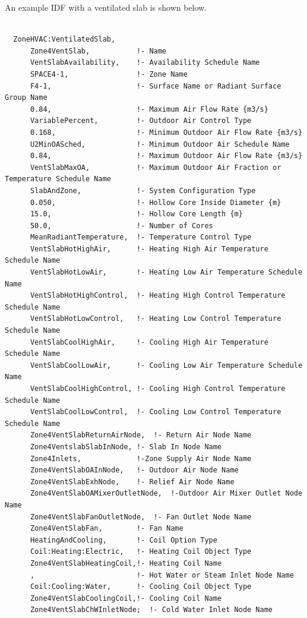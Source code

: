 An example IDF with a ventilated slab is shown below.

\begin{lstlisting}

  ZoneHVAC:VentilatedSlab,
      Zone4VentSlab,           !- Name
      VentSlabAvailability,    !- Availability Schedule Name
      SPACE4-1,                !- Zone Name
      F4-1,                    !- Surface Name or Radiant Surface Group Name
      0.84,                    !- Maximum Air Flow Rate {m3/s}
      VariablePercent,         !- Outdoor Air Control Type
      0.168,                   !- Minimum Outdoor Air Flow Rate {m3/s}
      U2MinOASched,            !- Minimum Outdoor Air Schedule Name
      0.84,                    !- Maximum Outdoor Air Flow Rate {m3/s}
      VentSlabMaxOA,           !- Maximum Outdoor Air Fraction or Temperature Schedule Name
      SlabAndZone,             !- System Configuration Type
      0.050,                   !- Hollow Core Inside Diameter {m}
      15.0,                    !- Hollow Core Length {m}
      50.0,                    !- Number of Cores
      MeanRadiantTemperature,  !- Temperature Control Type
      VentSlabHotHighAir,      !- Heating High Air Temperature Schedule Name
      VentSlabHotLowAir,       !- Heating Low Air Temperature Schedule Name
      VentSlabHotHighControl,  !- Heating High Control Temperature Schedule Name
      VentSlabHotLowControl,   !- Heating Low Control Temperature Schedule Name
      VentSlabCoolHighAir,     !- Cooling High Air Temperature Schedule Name
      VentSlabCoolLowAir,      !- Cooling Low Air Temperature Schedule Name
      VentSlabCoolHighControl, !- Cooling High Control Temperature Schedule Name
      VentSlabCoolLowControl,  !- Cooling Low Control Temperature Schedule Name
      Zone4VentSlabReturnAirNode,  !- Return Air Node Name
      Zone4VentslabSlabInNode, !- Slab In Node Name
      Zone4Inlets,             !-Zone Supply Air Node Name
      Zone4VentSlabOAInNode,   !- Outdoor Air Node Name
      Zone4VentSlabExhNode,    !- Relief Air Node Name
      Zone4VentSlabOAMixerOutletNode,  !-Outdoor Air Mixer Outlet Node Name
      Zone4VentSlabFanOutletNode,  !- Fan Outlet Node Name
      Zone4VentSlabFan,        !- Fan Name
      HeatingAndCooling,       !- Coil Option Type
      Coil:Heating:Electric,   !- Heating Coil Object Type
      Zone4VentSlabHeatingCoil,!- Heating Coil Name
      ,                        !- Hot Water or Steam Inlet Node Name
      Coil:Cooling:Water,      !- Cooling Coil Object Type
      Zone4VentSlabCoolingCoil,!- Cooling Coil Name
      Zone4VentSlabChWInletNode;  !- Cold Water Inlet Node Name
\end{lstlisting}

